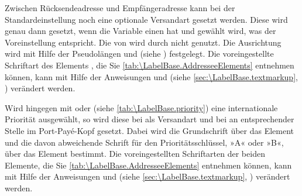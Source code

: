 \BeginIndexGroup
{} Zwischen
Rücksendeadresse und Empfängeradresse kann bei der Standardeinstellung
 noch
eine optionale Versandart gesetzt werden. Diese wird genau
dann gesetzt, wenn die Variable  einen 
hat und
%
 gewählt wird, was der Voreinstellung
entspricht. Die  von  wird durch
 nicht genutzt. Die Ausrichtung wird mit Hilfe der
Pseudolängen  und
 (siehe
) festgelegt. Die
voreingestellte Schriftart des Elements
, die Sie
\autoref{tab:\LabelBase.AddresseeElements} entnehmen können, kann mit Hilfe
der Anweisungen  und
 (siehe
\autoref{sec:\LabelBase.textmarkup}, )
verändert werden.%
\EndIndexGroup

\BeginIndexGroup
{}%
%
Wird%
 hingegen mit
 oder  (siehe
\autoref{tab:\LabelBase.priority}) eine internationale Priorität ausgewählt,
so wird diese bei  als Versandart und bei
 an entsprechender Stelle im Port-Payé-Kopf
gesetzt. Dabei wird die
Grundschrift über das Element  und die
davon abweichende Schrift für den Prioritätsschlüssel, »A« oder »B«, über das
Element  bestimmt. Die voreingestellten Schriftarten
der beiden Elemente, die Sie \autoref{tab:\LabelBase.AddresseeElements}
entnehmen können, kann mit Hilfe der Anweisungen
 und
 (siehe
\autoref{sec:\LabelBase.textmarkup}, )
verändert werden.%
\EndIndexGroup

